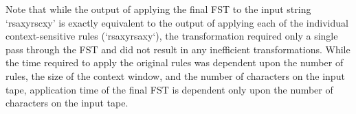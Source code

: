 Note that while the output of applying the final FST to the input string ‘rsaxyrscxy’ is exactly equivalent to the output of applying each of the individual context-sensitive rules (‘rsaxyrsaxy‘), the transformation required only a single pass through the FST and did not result in any inefficient transformations. While the time required to apply the original rules was dependent upon the number of rules, the size of the context window, and the number of characters on the input tape, application time of the final FST is dependent only upon the number of characters on the input tape.

\newpage

